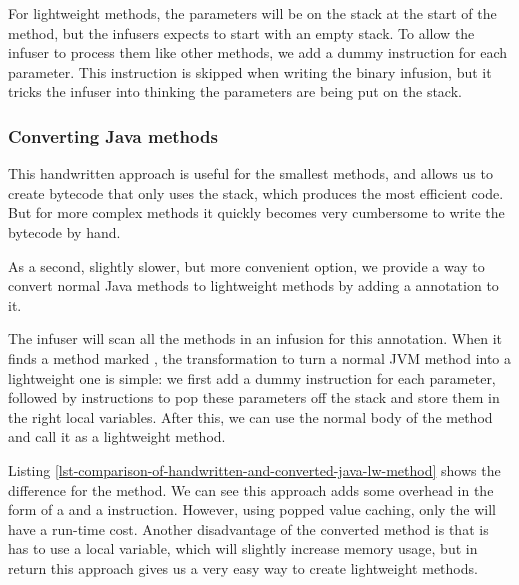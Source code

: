 For lightweight methods, the parameters will be on the stack at the start of the method, but the infusers expects to start with an empty stack. To allow the infuser to process them like other methods, we add a dummy  instruction for each parameter. This instruction is skipped when writing the binary infusion, but it tricks the infuser into thinking the parameters are being put on the stack.

\subsubsection{Converting Java methods}
This handwritten approach is useful for the smallest methods, and allows us to create bytecode that only uses the stack, which produces the most efficient code. But for more complex methods it quickly becomes very cumbersome to write the bytecode by hand.

As a second, slightly slower, but more convenient option, we provide a way to convert normal Java methods to lightweight methods by adding a  annotation to it.

The infuser will scan all the methods in an infusion for this annotation. When it finds a method marked , the transformation to turn a normal JVM method into a lightweight one is simple: we first add a dummy  instruction for each parameter, followed by  instructions to pop these parameters off the stack and store them in the right local variables. After this, we can use the normal body of the method and call it as a lightweight method.

Listing \ref{lst-comparison-of-handwritten-and-converted-java-lw-method} shows the difference for the  method. We can see this approach adds some overhead in the form of a  and a  instruction. However, using popped value caching, only the  will have a run-time cost. Another disadvantage of the converted method is that is has to use a local variable, which will slightly increase memory usage, but in return this approach gives us a very easy way to create lightweight methods.


